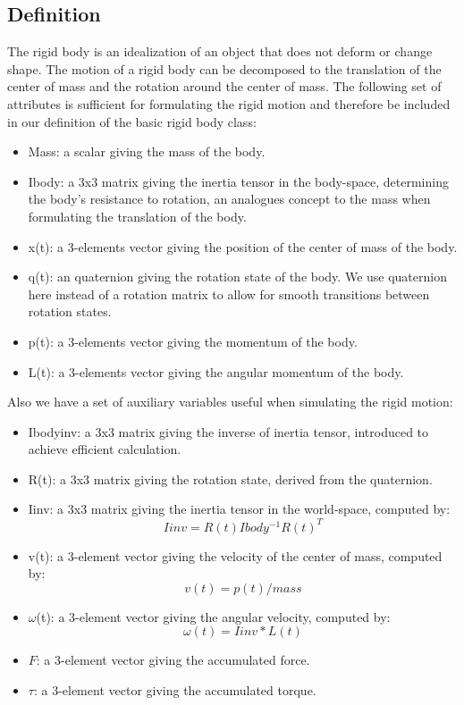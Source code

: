 \subsection{Definition}
The rigid body is an idealization of an object that does not deform or change shape. The motion of a rigid body can be decomposed to the translation of the center of mass and the rotation around the center of mass. The following set of attributes is sufficient for formulating the rigid motion and therefore be included in our definition of the basic rigid body class:
\label{sec:rigid body def}
\begin{itemize}
    \item Mass: a scalar giving the mass of the body.
    \item Ibody: a 3x3 matrix giving the inertia tensor in the body-space, determining the body's resistance to rotation, an analogues concept to the mass when formulating the translation of the body.
    \item x(t): a 3-elements vector giving the position of the center of mass of the body.
    \item q(t): an quaternion giving the rotation state of the body. We use quaternion here instead of a rotation matrix to allow for smooth transitions between rotation states. 
    \item p(t): a 3-elements vector giving the momentum of the body.
    \item L(t): a 3-elements vector giving the angular momentum of the body.
\end{itemize}
Also we have a set of auxiliary variables useful when simulating the rigid motion:
\begin{itemize}
    \item Ibodyinv: a 3x3 matrix giving the inverse of inertia tensor, introduced to achieve efficient calculation.
    \item R(t): a 3x3 matrix giving the rotation state, derived from the quaternion.
    \item Iinv: a 3x3 matrix giving the inertia tensor in the world-space, computed by:
    \begin{equation*}
        Iinv=R(t)Ibody^{-1}R(t)^T
    \end{equation*}
    \item v(t): a 3-element vector giving the velocity of the center of mass, computed by:
    \begin{equation*}
        v(t)=p(t)/mass
    \end{equation*}
    \item $\omega$(t): a 3-element vector giving the angular velocity, computed by:
    \begin{equation*}
        \omega(t)=Iinv*L(t)
    \end{equation*}
    \item $F$: a 3-element vector giving the accumulated force.
    \item $\tau$: a 3-element vector giving the accumulated torque.
\end{itemize}
